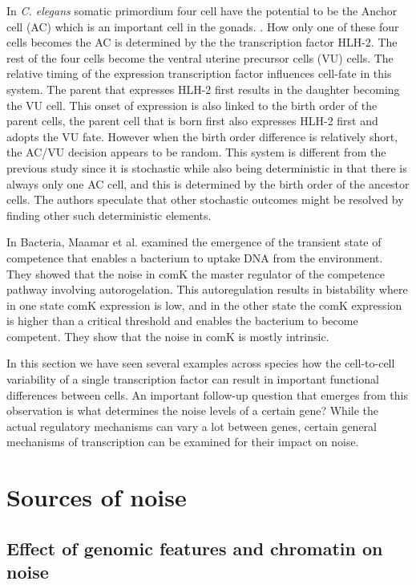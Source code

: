 In \emph{C. elegans} somatic primordium four cell have the potential to be the Anchor cell (AC) which is an important cell in the gonads. \cite{Attner}. How only one of these four cells becomes the AC is determined by the the transcription factor HLH-2. The rest of the four cells become the ventral uterine precursor cells (VU) cells. The relative timing of the expression transcription factor influences cell-fate in this system. The parent that expresses HLH-2 first results in the daughter becoming the VU cell. This onset of expression is also linked to the birth order of the parent cells, the parent cell that is born first also expresses HLH-2 first and adopts the VU fate. However when the birth order difference is  relatively short, the AC/VU decision appears to be random. This system is different from the previous study since it is stochastic while also being deterministic in that there is always only one AC cell, and this is determined by the birth order of the ancestor cells. The authors speculate that other stochastic outcomes might be resolved by finding other such deterministic elements. 

In Bacteria, Maamar et al.  \cite{Maamar} examined the emergence of the transient state of competence that enables a bacterium to uptake DNA from the environment. They showed that the noise in comK the master regulator of the competence pathway involving autorogelation. This autoregulation results in bistability where in one state comK expression is low, and in the other state the comK expression is higher than a critical threshold and enables the bacterium to become competent. They show that the noise in comK is mostly intrinsic.

In this section we have seen several examples across species how the cell-to-cell variability of a single transcription factor can result in important functional differences between cells. An important follow-up question that emerges from this observation is what determines the noise levels of a certain gene? While the actual regulatory mechanisms can vary a lot between genes, certain general mechanisms of transcription can be examined for their impact on noise.

\section{Sources of noise}

\subsection{Effect of genomic features and chromatin on noise}


